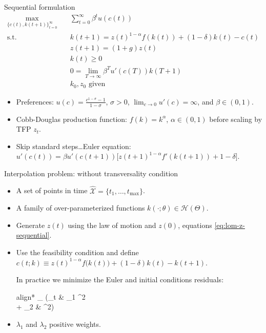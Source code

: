 \documentclass[aspectratio=169,10pt]{beamer}
\newcommand{\Xtrain}{\hat{\mathcal{X}}}
\newcommand{\st}{\textrm{s.t.}\,}
\begin{document}
\begin{frame}{Sequential formulation}
	\begin{align}
		\max_{\{c(t),k(t+1)\}_{t=0}^\infty} \quad & \sum_{t=0}^\infty \beta^t u\left(c(t)\right) \\
		\st\quad & k(t+1) = z(t)^{1-\alpha}f\left(k(t)\right) + (1-\delta)k(t) - c(t) \\
		\quad & z(t+1)=(1+g)z(t)\label{eq:lom-z-sequential}\\
		& k(t)\geq 0 \\
		\quad & 0 = \lim_{T\rightarrow \infty} \beta^T u'\left(c(T)\right)k(T+1)\label{eq:transversality-rbc-sequential} \\
		& k_0,z_0  \text{ given }
	\end{align}
	
	\begin{itemize}
		\item Preferences: $u(c) = \frac{c^{1-\sigma}-1}{1-\sigma}$, $\sigma > 0$, $\lim_{c\rightarrow 0} u'(c) = \infty$, and $\beta \in (0,1)$.
		\item Cobb-Douglas production function: $f(k) = k^{\alpha}$, $\alpha \in (0,1)$ before scaling by TFP $z_t$.
		\item Skip standard steps\ldots Euler equation: $u'(c(t)) = \beta u'(c(t+1)) \big[z(t+1)^{1-\alpha} f'(k(t+1)) + 1-\delta\big]$.
	\end{itemize}
\end{frame}


\begin{frame}{Interpolation problem: without transversality condition}
	\begin{itemize}
		\item A set of points in time $\Xtrain = \{t_1,\ldots,t_{\text{max}}\}$.
		\item A family of over-parameterized functions $k(\cdot;\theta) \in \mathcal{H}(\Theta)$.
		\item Generate $z(t)$ using the law of motion and $z(0)$, equations \cref{eq:lom-z-sequential}.
		\item Use the feasibility condition and define $c(t;k)\equiv z(t)^{1-\alpha}f\big(k(t)\big) + (1-\delta)k(t)-k(t+1)$.\vspace{5mm}
		
		In practice we minimize the Euler and initial conditions residuals:
		\begin{empheq}[box=\tcbhighmath]{align*}
			\min_{\theta \in \Theta}  \bigg(\frac{1}{|\Xtrain|}\sum_{t \in \Xtrain} & \lambda_1 ^2 \\  + \lambda_2
			&  ^2\bigg)
		\end{empheq}
		\item $\lambda_1$ and $\lambda_2$ positive weights.
	\end{itemize}
\end{frame}
\end{document}
